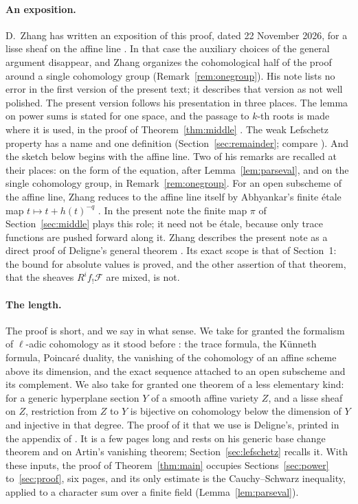 \documentclass[11pt,a4paper]{article}
\theoremstyle{plain}
\theoremstyle{remark}
\newcommand{\F}{\mathcal F}
\begin{document}
\paragraph{An exposition.}
D.~Zhang has written an exposition of this proof, dated 22 November 2026, for a lisse sheaf on the affine line
\cite{Zhang}. In that case the auxiliary choices of the general argument disappear, and Zhang organizes the
cohomological half of the proof around a single cohomology group (Remark~\ref{rem:onegroup}). His note lists no error
in the first version of the present text; it describes that version as not well polished. The present version
follows his presentation in three places. The lemma on power sums is stated for one space, and the passage to
$k$-th roots is made where it is used, in the proof of Theorem~\ref{thm:middle} \cite[Lemma 2.1, and the deduction
of Theorem 1.1 from Proposition 1.5]{Zhang}. The weak Lefschetz property has a name and one definition
(Section~\ref{sec:remainder}; compare \cite[Definition 2.3]{Zhang}). And the sketch below begins with the affine
line. Two of his remarks are recalled at their places: on the form of the equation, after
Lemma~\ref{lem:parseval}, and on the single cohomology group, in Remark~\ref{rem:onegroup}. For an open subscheme
of the affine line, Zhang reduces to the affine line itself by Abhyankar's finite \'etale map
$t\mapsto t+h(t)^{-q}$ \cite[Remark 1.2]{Zhang}. In the present note the finite map $\pi$ of
Section~\ref{sec:middle} plays this role; it need not be \'etale, because only trace functions are pushed forward
along it. Zhang describes the present note as a direct proof of Deligne's general theorem \cite[Remark 1.3]{Zhang}.
Its exact scope is that of Section~1: the bound for absolute values is proved, and the other assertion of that
theorem, that the sheaves $R^if_!\F$ are mixed, is not.

\paragraph{The length.}
The proof is short, and we say in what sense. We take for granted the formalism of $\ell$-adic cohomology as it stood
before \cite{WeilI}: the trace formula, the K\"unneth formula, Poincar\'e duality, the vanishing of the cohomology of
an affine scheme above its dimension, and the exact sequence attached to an open subscheme and its complement. We
also take for granted one theorem of a less elementary kind: for a generic hyperplane section $Y$ of a smooth
affine variety $Z$, and a lisse sheaf on $Z$, restriction from $Z$ to $Y$ is bijective on cohomology below the
dimension of $Y$ and injective in that degree. The proof of it that we use is Deligne's, printed in the appendix of
\cite{KatzACT}. It is a few pages long and rests on his generic base change theorem and on Artin's vanishing theorem;
Section~\ref{sec:lefschetz} recalls it. With these inputs, the proof of Theorem~\ref{thm:main} occupies
Sections~\ref{sec:power} to~\ref{sec:proof}, six pages, and its only estimate is the Cauchy--Schwarz
inequality, applied to a character sum over a finite field (Lemma~\ref{lem:parseval}).
\end{document}
